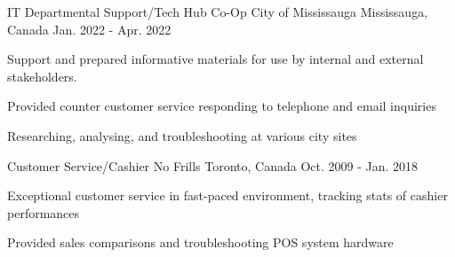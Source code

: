 \begin{cventries}
  \cventry
    {IT Departmental Support/Tech Hub Co-Op}
    {City of Mississauga}
    {Mississauga, Canada}
    {Jan. 2022 - Apr. 2022}
    {
      \begin{cvitems}
        \item {Support and prepared informative materials for use by internal and external stakeholders.}
        \item {Provided counter customer service responding to telephone and email inquiries}
        \item {Researching, analysing, and troubleshooting at various city sites}
      \end{cvitems}
    }
  \cventry
    {Customer Service/Cashier}
    {No Frills}
    {Toronto, Canada}
    {Oct. 2009 - Jan. 2018}
    {
      \begin{cvitems}
        \item {Exceptional customer service in fast-paced environment, tracking stats of cashier performances}
        \item {Provided sales comparisons and troubleshooting POS system hardware}
      \end{cvitems}
    }
\end{cventries}